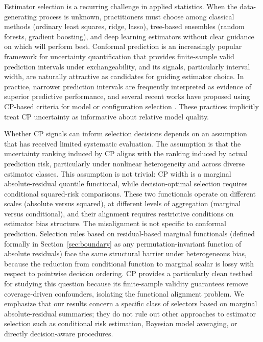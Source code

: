 \documentclass[a4paper,11pt]{article}
\begin{document}
Estimator selection is a recurring challenge in applied statistics. When the data-generating process is unknown, practitioners must choose among classical methods (ordinary least squares, ridge, lasso), tree-based ensembles (random forests, gradient boosting), and deep learning estimators without clear guidance on which will perform best. Conformal prediction \citep[CP;][]{angelopoulos2023} is an increasingly popular framework for uncertainty quantification that provides finite-sample valid prediction intervals under exchangeability, and its signals, particularly interval width, are naturally attractive as candidates for guiding estimator choice. In practice, narrower prediction intervals are frequently interpreted as evidence of superior predictive performance, and several recent works have proposed using CP-based criteria for model or configuration selection \citep{yang2024conformal}. These practices implicitly treat CP uncertainty as informative about relative model quality.

Whether CP signals can inform selection decisions depends on an assumption that has received limited systematic evaluation. The assumption is that the uncertainty ranking induced by CP aligns with the ranking induced by actual prediction risk, particularly under nonlinear heterogeneity and across diverse estimator classes. This assumption is not trivial: CP width is a marginal absolute-residual quantile functional, while decision-optimal selection requires conditional squared-risk comparisons. These two functionals operate on different scales (absolute versus squared), at different levels of aggregation (marginal versus conditional), and their alignment requires restrictive conditions on estimator bias structure. The misalignment is not specific to conformal prediction. Selection rules based on residual-based marginal functionals (defined formally in Section~\ref{sec:boundary} as any permutation-invariant function of absolute residuals) face the same structural barrier under heterogeneous bias, because the reduction from conditional function to marginal scalar is lossy with respect to pointwise decision ordering. CP provides a particularly clean testbed for studying this question because its finite-sample validity guarantees remove coverage-driven confounders, isolating the functional alignment problem. We emphasize that our results concern a specific class of selectors based on marginal absolute-residual summaries; they do not rule out other approaches to estimator selection such as conditional risk estimation, Bayesian model averaging, or directly decision-aware procedures.
\end{document}
